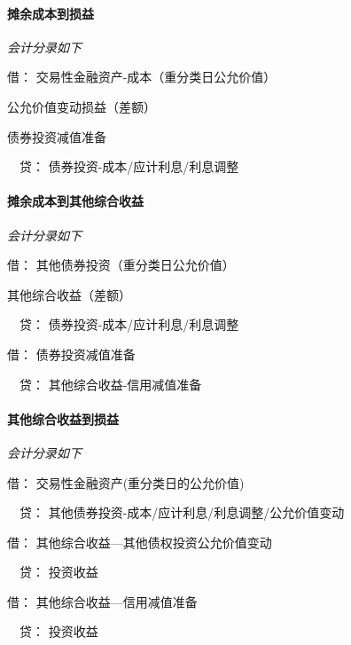 \documentclass[UTF8,12pt]{ctexart}
\newenvironment{Dr}{\noindent 借：}{\par}
\newenvironment{Cr}{\noindent \ \ 贷：}{\par}
\numberwithin{equation}{section} %
\numberwithin{figure}{section}
\numberwithin{table}{section}
\begin{document}
	\paragraph{摊余成本到损益}\textit{会计分录如下}
	
	\begin{Dr}
		交易性金融资产-成本（重分类日公允价值）
		
		公允价值变动损益（差额）
		
		债券投资减值准备
	\end{Dr}
	\begin{Cr}
		债券投资-成本/应计利息/利息调整
	\end{Cr}
	
	\paragraph{摊余成本到其他综合收益}\textit{会计分录如下}
	
	\begin{Dr}
		其他债券投资（重分类日公允价值）
		
		其他综合收益（差额）
	\end{Dr}
	\begin{Cr}
		债券投资-成本/应计利息/利息调整
	\end{Cr}
	
	\begin{Dr}
		债券投资减值准备
	\end{Dr}
	\begin{Cr}
		其他综合收益-信用减值准备
	\end{Cr}
	
	\paragraph{其他综合收益到损益}\textit{会计分录如下}
	
	\begin{Dr}
		交易性金融资产(重分类日的公允价值)  
	\end{Dr}
	\begin{Cr}
		其他债券投资-成本/应计利息/利息调整/公允价值变动
	\end{Cr}
	
	\begin{Dr}
		其他综合收益—其他债权投资公允价值变动  
	\end{Dr}
	\begin{Cr}
		投资收益
	\end{Cr}
	
	\begin{Dr}
		其他综合收益—信用减值准备
	\end{Dr}
	\begin{Cr}
		投资收益
	\end{Cr}
	
\end{document}
